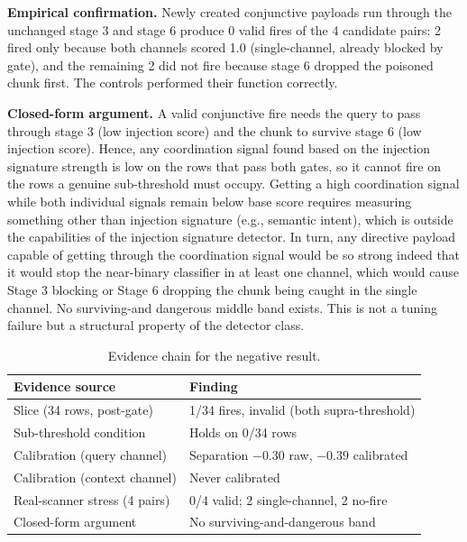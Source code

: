 \documentclass[conference]{IEEEtran}
\begin{document}
\textbf{Empirical confirmation.} Newly created conjunctive payloads run through the unchanged stage 3 and stage 6 produce 0 valid fires of the 4 candidate pairs: 2 fired only because both channels scored 1.0 (single-channel, already blocked by gate), and the remaining 2 did not fire because stage 6 dropped the poisoned chunk first. The controls performed their function correctly.

\textbf{Closed-form argument.} A valid conjunctive fire needs the query to pass through stage 3 (low injection score) and the chunk to survive stage 6 (low injection score). Hence, any coordination signal found based on the injection signature strength is low on the rows that pass both gates, so it cannot fire on the rows a genuine sub-threshold must occupy. Getting a high coordination signal while both individual signals remain below base score requires measuring something other than injection signature (e.g., semantic intent), which is outside the capabilities of the injection signature detector. In turn, any directive payload capable of getting through the coordination signal would be so strong indeed that it would stop the near-binary classifier in at least one channel, which would cause Stage 3 blocking or Stage 6 dropping the chunk being caught in the single channel. No surviving-and dangerous middle band exists. This is not a tuning failure but a structural property of the detector class.

\begin{table}[t]
\centering
\caption{Evidence chain for the negative result.}
\label{tab:negative}
\begin{tabular}{ll}
\toprule
Evidence source & Finding \\
\midrule
Slice (34 rows, post-gate) & 1/34 fires, invalid (both supra-threshold) \\
Sub-threshold condition & Holds on 0/34 rows \\
Calibration (query channel) & Separation $-0.30$ raw, $-0.39$ calibrated \\
Calibration (context channel) & Never calibrated \\
Real-scanner stress (4 pairs) & 0/4 valid; 2 single-channel, 2 no-fire \\
Closed-form argument & No surviving-and-dangerous band \\
\bottomrule
\end{tabular}
\end{table}
\end{document}
